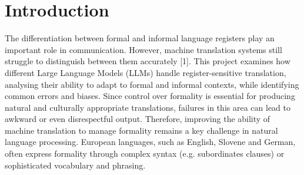 \documentclass[fleqn,moreauthors,10pt]{ds_report}
\affiliation{\textit{Advisors: Ale\v{s} \v{Z}agar}}
\begin{document}
	
	\flushbottom 
	
	\maketitle 
	
	\thispagestyle{empty} 
	
	
	\section*{Introduction}
	The differentiation between formal and informal language registers play an important role in communication. However, machine translation systems still struggle to distinguish between them accurately [1]. This project examines how different Large Language Models (LLMs) handle register-sensitive translation, analysing their ability to adapt to formal and informal contexts, while identifying common errors and biases. Since control over formality is essential for producing natural and culturally appropriate translations, failures in this area can lead to awkward or even disrespectful output. Therefore, improving the ability of machine translation to manage formality remains a key challenge in natural language processing.
	European languages, such as English, Slovene and German, often express formality through complex syntax (e.g. subordinates clauses) or sophisticated vocabulary and phrasing.
	
\end{document}
